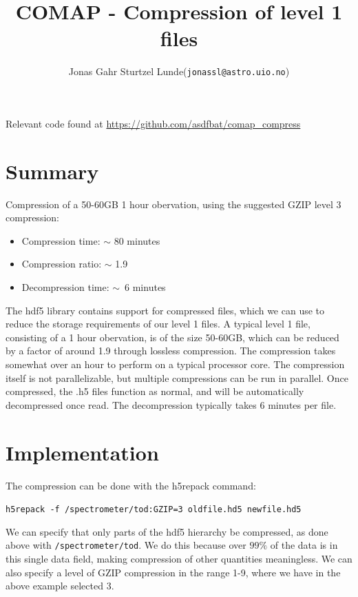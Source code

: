\documentclass[10pt, a4paper]{article}
\begin{document}
\title{COMAP - Compression of level 1 files}
\author{
    \begin{tabular}{r l}
        Jonas Gahr Sturtzel Lunde & (\texttt{jonassl@astro.uio.no})
    \end{tabular}}
\maketitle
Relevant code found at \url{https://github.com/asdfbat/comap_compress}
\vspace{0.7cm}

\section*{Summary}
Compression of a 50-60GB 1 hour obervation, using the suggested GZIP level 3 compression:
\begin{itemize}
    \item Compression time: $\sim$ 80 minutes
    \item Compression ratio: $\sim$ 1.9
    \item Decompression time: $\sim$ 6 minutes
\end{itemize}

The hdf5 library contains support for compressed files, which we can use to reduce the storage requirements of our level 1 files. A typical level 1 file, consisting of a 1 hour obervation, is of the size 50-60GB, which can be reduced by a factor of around 1.9 through lossless compression. The compression takes somewhat over an hour to perform on a typical processor core. The compression itself is not parallelizable, but multiple compressions can be run in parallel. Once compressed, the .h5 files function as normal, and will be automatically decompressed once read. The decompression typically takes 6 minutes per file.


\section*{Implementation}
The compression can be done with the h5repack command:

\texttt{h5repack -f /spectrometer/tod:GZIP=3 oldfile.hd5 newfile.hd5}

We can specify that only parts of the hdf5 hierarchy be compressed, as done above with \texttt{/spectrometer/tod}. We do this because over $99\%$ of the data is in this single data field, making compression of other quantities meaningless. We can also specify a level of GZIP compression in the range 1-9, where we have in the above example selected 3.
\end{document}
